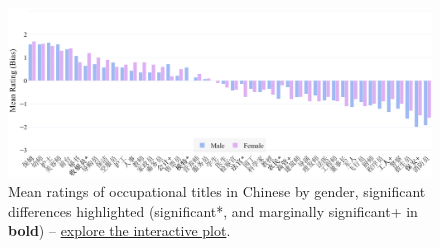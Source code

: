 \documentclass[11pt]{article}
\begin{document}
\begin{figure}[tbp]
  \centering
  \includegraphics[width=\linewidth]{../occupations_zh_gender}
  \caption{Mean ratings of occupational titles in Chinese by gender, significant differences highlighted (significant*, and marginally significant+ in \textbf{bold}) -- \href{https://htmlpreview.github.io/?https://github.com/partigabor/occupational-bias/blob/main/occupations_zh_gender.html}{explore the interactive plot}.}
  \label{fig:occupations_zh_gender}
\end{figure}
\end{document}

